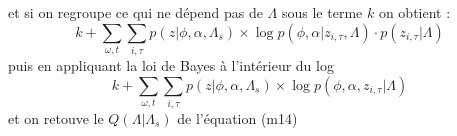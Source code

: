 \documentclass[a4paper,12pt]{article}
\begin{document}
et si on regroupe ce qui ne dépend pas de $\Lambda$ sous le terme $k$ on obtient :
\begin{equation*}
k + \displaystyle\sum_{\omega,t} \displaystyle\sum_{i, \tau} p(z|\phi,\alpha,\Lambda_s) \times \log p(\phi, \alpha | z_{i, \tau}, \Lambda) \cdot p(z_{i, \tau} | \Lambda)
\end{equation*}
puis en appliquant la loi de Bayes à l'intérieur du log
\begin{equation*}
k + \displaystyle\sum_{\omega,t} \displaystyle\sum_{i, \tau} p(z|\phi,\alpha,\Lambda_s) \times \log p(\phi, \alpha, z_{i, \tau} | \Lambda)
\end{equation*}
et on retouve le $Q(\Lambda|\Lambda_s)$ de l'équation (m14)
\end{document}
